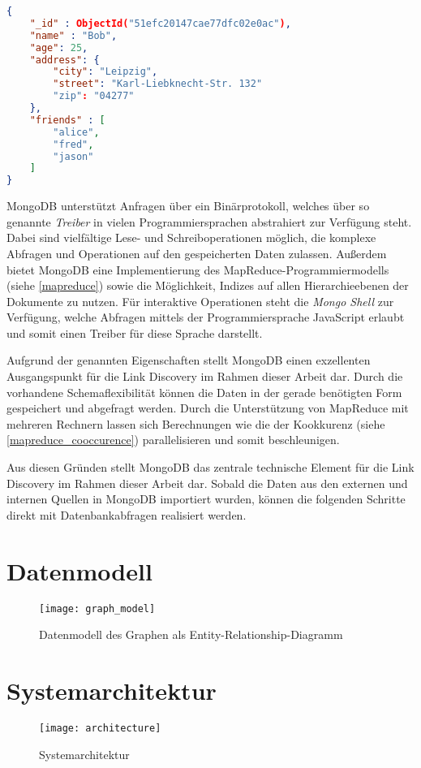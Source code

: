 \begin{lstlisting}[language=json, label={lst:json}, caption={Ein Beispiel für ein Dokument in MongoDB}]
{
    "_id" : ObjectId("51efc20147cae77dfc02e0ac"),
    "name" : "Bob",
    "age": 25,
    "address": {
        "city": "Leipzig",
        "street": "Karl-Liebknecht-Str. 132"
        "zip": "04277"
    },
    "friends" : [
        "alice",
        "fred",
        "jason"
    ]
}
\end{lstlisting}

MongoDB unterstützt Anfragen über ein Binärprotokoll, welches über so genannte \emph{Treiber} in vielen Programmiersprachen abstrahiert zur Verfügung steht. Dabei sind vielfältige Lese- und Schreiboperationen möglich, die komplexe Abfragen und Operationen auf den gespeicherten Daten zulassen. Außerdem bietet MongoDB eine Implementierung des MapReduce-Programmiermodells (siehe \ref{mapreduce}) sowie die Möglichkeit, Indizes auf allen Hierarchieebenen der Dokumente zu nutzen. Für interaktive Operationen steht die \emph{Mongo Shell} zur Verfügung, welche Abfragen mittels der Programmiersprache JavaScript erlaubt und somit einen Treiber für diese Sprache darstellt.

Aufgrund der genannten Eigenschaften stellt MongoDB einen exzellenten Ausgangspunkt für die Link Discovery im Rahmen dieser Arbeit dar. Durch die vorhandene Schemaflexibilität können die Daten in der gerade benötigten Form gespeichert und abgefragt werden. Durch die Unterstützung von MapReduce mit mehreren Rechnern lassen sich Berechnungen wie die der Kookkurenz (siehe \ref{mapreduce_cooccurence}) parallelisieren und somit beschleunigen.

Aus diesen Gründen stellt MongoDB das zentrale technische Element für die Link Discovery im Rahmen dieser Arbeit dar. Sobald die Daten aus den externen und internen Quellen in MongoDB importiert wurden, können die folgenden Schritte direkt mit Datenbankabfragen realisiert werden.

\section{Datenmodell}

\begin{figure}
\label{fig:graph_model}
\begin{center}
    \texttt{[image: graph\_model]}
\end{center}
\caption{Datenmodell des Graphen als Entity-Relationship-Diagramm}
\end{figure}

\section{Systemarchitektur}

\begin{figure}
\label{fig:architecture}
\begin{center}
    \texttt{[image: architecture]}
\end{center}
\caption{Systemarchitektur}
\end{figure}

